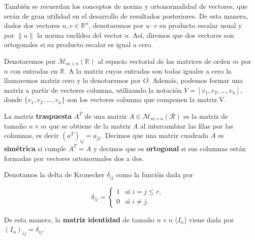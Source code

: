 También se recuerdan los conceptos de norma y ortonormalidad de vectores, que serán de gran utilidad en el desarrollo de resultados posteriores. De esta manera, dados dos vectores $u, v \in \mathbb{R}^{n}$, denotaremos por $u \cdot v$ su producto escalar usual y por $\| u \|$ la norma euclídea del vector $u$. Así, diremos que dos vectores son ortogonales si su producto escalar es igual a cero.

Denotaremos por $\mathcal{M}_{m \times n}(\mathbb{R})$ al espacio vectorial de las matrices de orden $m$ por $n$ con entradas en $\mathbb{R}$. A la matriz cuyas entradas son todas iguales a cero la llamaremos matriz cero y la denotaremos por $O$. Además, podemos formar una matriz a partir de vectores columna, utilizando la notación $V = [v_1, v_2, \ldots, v_n]$, donde $\{v_1, v_2, \ldots, v_n\}$ son los vectores columna que componen la matriz V.

\begin{definicion}
    La matriz \textbf{traspuesta} $A^{T}$ de una matriz $A \in \mathcal{M}_{m \times n}(\mathcal{R})$ es la matriz de tamaño $n \times m$ que se obtiene de la matriz $A$ al intercambiar las filas por las columnas, es decir $(a^{T})_{ij} = a_{ji}$. Decimos que una matriz cuadrada $A$ es \textbf{simétrica} si cumple $A^{T} = A$ y decimos que es \textbf{ortogonal} si sus columnas están formadas por vectores ortonormales dos a dos.
\end{definicion}

Denotamos la delta de Kronecker $\delta_{ij}$ como la función dada por

\[
    \delta_{ij} =
    \begin{cases}
        1 & \text{si } i = j \leq r, \\
        0 & \text{si } i \neq j.
    \end{cases}
\]

De esta manera, la \textbf{matriz identidad} de tamaño $n \times n$ ($I_{n}$) viene dada por $(I_n)_{ij} = \delta_{ij}$.

